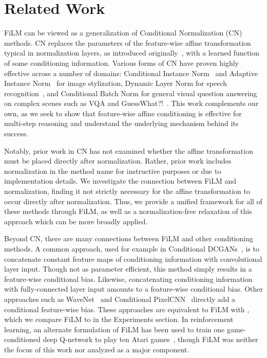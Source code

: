 \documentclass[letterpaper]{article} \usepackage{aaai18}  \usepackage{times}  \usepackage{helvet}  \usepackage{courier}  \usepackage{url}  \usepackage{graphicx}  \frenchspacing  \setlength{\pdfpagewidth}{8.5in}  \setlength{\pdfpageheight}{11in}
\begin{document}
\section{Related Work}\label{relatedwork}

	FiLM can be viewed as a generalization of Conditional Normalization (CN) methods. CN replaces the parameters of the feature-wise affine transformation typical in normalization layers, as introduced originally~\cite{BN}, with a learned function of some conditioning information. Various forms of CN have proven highly effective across a number of domains: Conditional Instance Norm~\cite{CIN,CIN2} and Adaptive Instance Norm~\cite{AIN} for image stylization, Dynamic Layer Norm for speech recognition~\cite{DynamicLayerNorm}, and Conditional Batch Norm for general visual question answering on complex scenes such as VQA and GuessWhat?!~\cite{modulating_vision}. This work complements our own, as we seek to show that feature-wise affine conditioning is effective for multi-step reasoning and understand the underlying mechanism behind its success.
    
    Notably, prior work in CN has not examined whether the affine transformation must be placed directly after normalization. Rather, prior work includes normalization in the method name for instructive purposes or due to implementation details. We investigate the connection between FiLM and normalization, finding it not strictly necessary for the affine transformation to occur directly after normalization. Thus, we provide a unified framework for all of these methods through FiLM, as well as a normalization-free relaxation of this approach which can be more broadly applied.

	Beyond CN, there are many connections between FiLM and other conditioning methods. A common approach, used for example in Conditional DCGANs~\cite{DCGAN}, is to concatenate constant feature maps of conditioning information with convolutional layer input. Though not as parameter efficient, this method simply results in a feature-wise conditional bias. Likewise, concatenating conditioning information with fully-connected layer input amounts to a feature-wise conditional bias. Other approaches such as WaveNet~\cite{WaveNet} and Conditional PixelCNN~\cite{van2016conditional} directly add a conditional feature-wise bias. These approaches are equivalent to FiLM with , which we compare FiLM to in the Experiments section. In reinforcement learning, an alternate formulation of FiLM has been used to train one game-conditioned deep Q-network to play ten Atari games~\cite{OCF}, though FiLM was neither the focus of this work nor analyzed as a major component.
    
\end{document}
